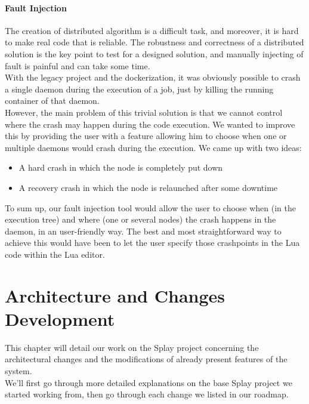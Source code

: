 \documentclass{eplmastersthesis}
\begin{document}
        \subsubsection{Fault Injection}

          The creation of distributed algorithm is a difficult task, and
          moreover, it is hard to make real code that is reliable. The robustness
          and correctness of a distributed solution is the key point to test
          for a designed solution, and manually injecting of fault is painful
          and can take some time. \\

          With the legacy project and the dockerization, it was obviously
          possible to crash a single daemon during the execution of a job, just
          by killing the running container of that daemon.\\
          However, the main problem of this trivial solution is that we cannot
          control where the crash may happen during the code execution.
          We wanted to improve this by providing the user with a feature
          allowing him to choose when one or multiple daemons would crash during
          the execution. We came up with two ideas:

          \begin{itemize}
            \item A hard crash in which the node is completely put down
            \item A recovery crash in which the node is relaunched after some
            downtime
          \end{itemize}

          To sum up, our fault injection tool would allow the user to choose
          when (in the execution tree) and where (one or several nodes) the
          crash happens in the daemon, in an user-friendly way. The best and
          most straightforward way to achieve this would have been to let
          the user specify those crashpoints in the Lua code within the Lua
          editor.

  \chapter{Architecture and Changes Development}

    This chapter will detail our work on the Splay project concerning the
    architectural changes and the modifications of already present features
    of the system.\\
    We'll first go through more detailed explanations on the base Splay
    project we started working from, then go through each change we listed
    in our roadmap.
\end{document}
